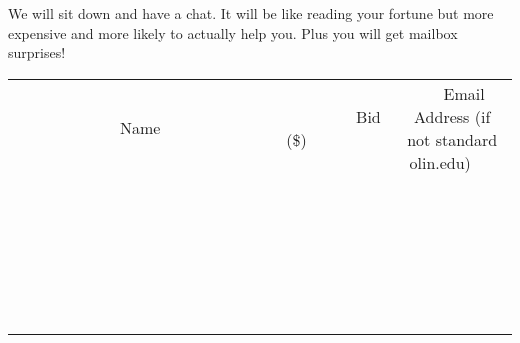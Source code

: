 \documentclass[11pt]{article}
\begin{document}
We will sit down and have a chat. It will be like reading your fortune but more expensive and more likely to actually help you. Plus you will get mailbox surprises! \\[6ex]
\begin{tabular}{c c c}
~~~~~~~~~~~~~Name~~~~~~~~~~~~~ & ~~~~~~~~~Bid (\$)~~~~~~~~~ & ~~~Email Address (if not standard olin.edu)~~~ \\
 & & \\
\hline
 & & \\
\hline
 & & \\
\hline
 & & \\
\hline
 & & \\
\hline
 & & \\
\hline
 & & \\
\hline
 & & \\
\hline
 & & \\
\hline
 & & \\
\hline
 & & \\
\hline
 & & \\
\hline
 & & \\
\hline
 & & \\
\hline
 & & \\
\hline
 & & \\
\hline
 & & \\
\hline
 & & \\
\hline
 & & \\
\hline
 & & \\
\hline
 & & \\
\hline
 & & \\
\hline
 & & \\
\hline
 & & \\
\hline
 & & \\
\hline
 & & \\
\hline
\end{tabular}
\clearpage
\end{document}

